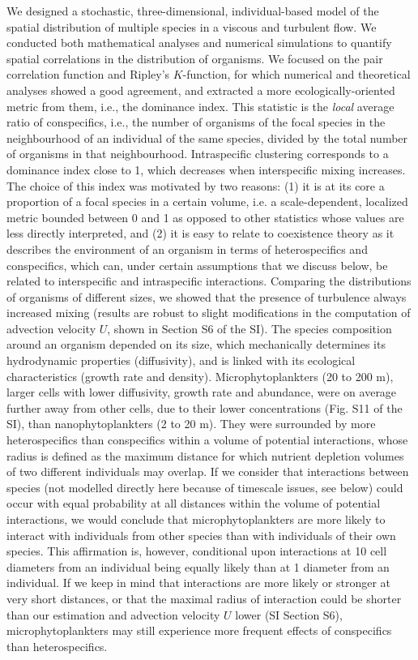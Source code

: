 \documentclass[12pt,english]{article}
\begin{document}
We designed a stochastic, three-dimensional, individual-based model
of the spatial distribution of multiple species in a viscous and turbulent
flow. We conducted both mathematical analyses and numerical simulations
to quantify spatial correlations in the distribution of organisms.
We focused on the pair correlation function and Ripley's $K$-function,
for which numerical and theoretical analyses showed a good agreement,
and extracted a more ecologically-oriented metric from them, i.e.,
the dominance index. This statistic is the \textit{local} average
ratio of conspecifics, i.e., the number of organisms of the focal
species in the neighbourhood of an individual of the same species,
divided by the total number of organisms in that neighbourhood. Intraspecific
clustering corresponds to a dominance index close to 1, which decreases
when interspecific mixing increases. The choice of this index was
motivated by two reasons: (1) it is at its core a proportion of a
focal species in a certain volume, i.e. a scale-dependent, localized metric bounded between 0 and 1 as opposed to other statistics whose values are less directly interpreted, and (2) it is easy to relate to coexistence theory as it describes the environment of an organism
in terms of heterospecifics and conspecifics, which can, under certain
assumptions that we discuss below, be related to interspecific and intraspecific interactions. Comparing the distributions of organisms of different sizes, we showed that the presence of turbulence always increased mixing (results are robust to slight modifications in the
computation of advection velocity $U$, shown in Section S6 of the
SI). The species composition around an organism depended on its size,
which mechanically determines its hydrodynamic properties (diffusivity),
and is linked with its ecological characteristics (growth rate and
density). Microphytoplankters (20 to 200 \textmu m), larger cells
with lower diffusivity, growth rate and abundance, were on average
further away from other cells, due to their lower concentrations (Fig.
S11 of the SI), than nanophytoplankters (2 to 20 \textmu m). They were surrounded by more heterospecifics than conspecifics within
a volume of potential interactions, whose radius is defined as the
maximum distance for which nutrient depletion volumes of two different
individuals may overlap. If we consider that interactions between
species (not modelled directly here because of timescale issues, see
below) could occur with equal probability at all distances within
the volume of potential interactions, we would conclude that microphytoplankters are more likely to interact with individuals from other species than with individuals of their own species. This affirmation is, however, conditional upon interactions at 10 cell diameters from an individual being equally likely than at 1 diameter from an individual. If we
keep in mind that interactions are more likely or stronger at very
short distances, or that the maximal radius of interaction could be shorter than our estimation and advection velocity $U$ lower (SI Section S6), microphytoplankters may still experience more frequent effects of conspecifics than heterospecifics.
\end{document}
